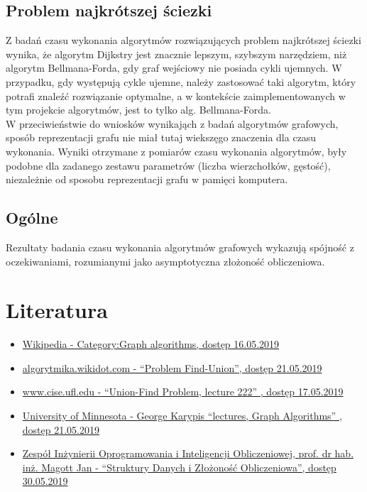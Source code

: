 \documentclass[12pt]{article}
\begin{document}
\subsection{Problem najkrótszej ściezki}
Z badań czasu wykonania algorytmów rozwiązujących problem najkrótszej ściezki wynika, że algorytm Dijkstry jest znacznie lepszym, szybszym narzędziem, niż algorytm Bellmana-Forda, gdy graf wejściowy nie posiada cykli ujemnych. W przypadku, gdy występują cykle ujemne, należy zastosować taki algorytm, który potrafi znaleźć rozwiązanie optymalne, a w kontekście zaimplementowanych w tym projekcie algorytmów, jest to tylko alg. Bellmana-Forda. \\
W przeciwieństwie do wniosków wynikająch z badań algorytmów grafowych, sposób reprezentacji grafu nie miał tutaj wiekszęgo znaczenia dla czasu wykonania. Wyniki otrzymane z pomiarów czasu wykonania algorytmów, były podobne dla zadanego zestawu parametrów (liczba wierzchołków, gęstość), niezależnie od sposobu reprezentacji grafu w pamięci komputera.
\subsection{Ogólne}
Rezultaty badania czasu wykonania algorytmów grafowych wykazują spójność z oczekiwaniami, rozumianymi jako asymptotyczna złożoność obliczeniowa. \\

\section{Literatura}
\begin{itemize}
    \item \href{https://en.wikipedia.org/wiki/Category:Graph_algorithms}{Wikipedia - Category:Graph algorithms, dostęp 16.05.2019}
    \item \href{http://algorytmika.wikidot.com/find-union}{algorytmika.wikidot.com - ``Problem Find-Union'', dostęp 21.05.2019}
    \item \href{https://www.cise.ufl.edu/~sahni/cop3530/slides/lec222.pdf}{www.cise.ufl.edu - ``Union-Find Problem, lecture 222'' , dostęp 17.05.2019}
    \item \href{https://www-users.cs.umn.edu/~karypis/parbook/Lectures/AG/chap10_slides.pdf}{University of Minnesota - George Karypis ``lectures, Graph Algorithms'' , dostęp 21.05.2019}
    \item \href{http://www.zio.iiar.pwr.wroc.pl/sdizo.html}{Zespół Inżynierii Oprogramowania i Inteligencji Obliczeniowej, prof. dr hab. inż. Magott Jan - ``Struktury Danych i Złożoność Obliczeniowa'', dostęp 30.05.2019}
\end{itemize}
\end{document}
